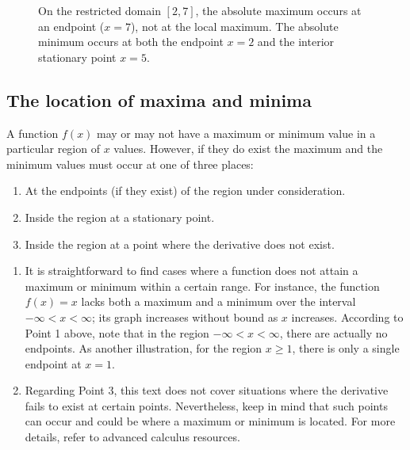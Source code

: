 \begin{figure}[htbp]
    \caption{On the restricted domain \([2, 7]\), the absolute maximum occurs at an endpoint (\(x=7\)), not at the local maximum. The absolute minimum occurs at both the endpoint \(x=2\) and the interior stationary point \(x=5\).}
    \label{fig:restricted-domain-extrema}
\end{figure}

\subsection*{The location of maxima and minima}
A function $f(x)$ may or may not have a maximum or minimum value in a particular region of $x$ values. However, if they do exist the maximum and the minimum values must occur at one of three places:

\begin{enumerate}
  \item At the endpoints (if they exist) of the region under consideration.
  \item Inside the region at a stationary point.
  \item Inside the region at a point where the derivative does not exist.
\end{enumerate}

\begin{remark}
    

\begin{enumerate}
  \item It is straightforward to find cases where a function does not attain a maximum or minimum within a certain range. For instance, the function $f(x) = x$ lacks both a maximum and a minimum over the interval $-\infty < x < \infty$; its graph increases without bound as $x$ increases. According to Point 1 above, note that in the region $-\infty < x < \infty$, there are actually no endpoints. As another illustration, for the region $x \geq 1$, there is only a single endpoint at $x = 1$.
  \item Regarding Point 3, this text does not cover situations where the derivative fails to exist at certain points. Nevertheless, keep in mind that such points can occur and could be where a maximum or minimum is located. For more details, refer to advanced calculus resources.
\end{enumerate}
\end{remark}

